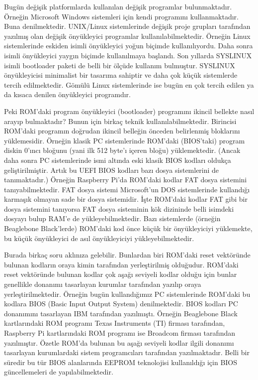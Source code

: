 \documentclass[a4paper,10pt,turkish]{sphinxmanual}
\begin{document}
\sphinxAtStartPar
Bugün değişik platformlarda kullanılan değişik  programlar bulunmaktadır. Örneğin Microsoft Windows
sistemleri için kendi  programını kullanmaktadır. Buna  denilmektedir.
UNIX/Linux sistemlerinde değişik proje grupları tarafından yazılmış olan değişik önyükleyici programlar
kullanılabilmektedir. Örneğin Linux sistemlerinde eskiden  isimli önyükleyici yoğun biçimde kullanılıyordu.
Daha sonra  isimli önyükleyici yaygın biçimde kullanılmaya başlandı. Son yıllarda SYSLINUX isimli bootloader
paketi de belli bir ölçüde kullanım bulmuştur. SYSLINUX önyükleyicisi minimalist bir tasarıma sahiptir ve daha çok
küçük sistemlerde tercih edilmektedir. Gömülü Linux sistemlerinde ise bugün en çok tercih edilen  ya da
kısaca  denilen önyükleyici programdır.

\sphinxAtStartPar
Peki ROM’daki program önyükleyici (bootloader) programını ikincil bellekte nasıl arayıp bulmaktadır? Bunun için
birkaç teknik kullanılabilmektedir. Birincisi ROM’daki programın doğrudan ikincil belleğin önceden belirlenmiş
bloklarını yüklemesidir. Örneğin klasik PC sistemlerinde ROM’daki (BIOS’taki) program diskin 0’ıncı bloğunu
(yani ilk 512 byte’ı içeren bloğu) yüklemektedir. (Ancak daha sonra PC sistemlerinde  ismi altında eski
klasik BIOS kodları oldukça geliştirilmiştir. Artık bu UEFI BIOS kodları bazı dosya sistemlerini de tanımaktadır.)
Örneğin Raspberry Pi’da ROM’daki kodlar FAT dosya sistemini tanıyabilmektedir. FAT dosya sistemi Microsoft’un DOS
sistemlerinde kullandığı karmaşık olmayan sade bir dosya sistemidir. İşte ROM’daki kodlar FAT gibi bir dosya
sistemini tanıyorsa FAT dosya sisteminin kök dizininde belli isimdeki dosyayı bulup RAM’e de yükleyebilmektedir.
Bazı sistemlerde (örneğin Beaglebone Black’lerde) ROM’daki kod önce küçük bir önyükleyiciyi yüklemekte, bu küçük
önyükleyici de asıl önyükleyiciyi yükleyebilmektedir.

\sphinxAtStartPar
Burada birkaç soru aklınıza gelebilir. Bunlardan biri ROM’daki reset vektöründe bulunan kodların oraya kimin
tarafından yerleştirilmiş olduğudur. ROM’daki reset vektöründe bulunan kodlar çok aşağı seviyeli kodlar olduğu
için bunlar genellikle donanımı tasarlayan kurumlar tarafından yazılıp oraya yerleştirilmektedir. Örneğin bugün
kullandığımız PC sistemlerinde ROM’daki bu kodlara BIOS (Basic Input Output System) denilmektedir. BIOS kodları PC
donanımını tasarlayan IBM tarafından yazılmıştı. Örneğin Beaglebone Black kartlarındaki ROM programı Texas
Instruments (TI) firması tarafından, Raspberry Pi kartlarındaki ROM programı ise Broadcom firması tarafından
yazılmıştır. Özetle ROM’da bulunan bu aşağı seviyeli kodlar ilgili donanımı tasarlayan kurumlardaki sistem
programcıları tarafından yazılmaktadır. Belli bir süredir bu tür BIOS alanlarında EEPROM teknolojisi kullanıldığı
için BIOS güncellemeleri de yapılabilmektedir.
\end{document}
